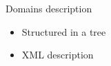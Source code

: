 \begin{FrameWithSubSection}
    \begin{minipage}{0.49\textwidth}
    \begin{block}{Domains description}
        \begin{itemize}
            \item Structured in a tree
            \item XML description
        \end{itemize}
    \end{block}
    \end{minipage}
    \begin{minipage}{0.49\textwidth}
    \end{minipage}
\end{FrameWithSubSection}
